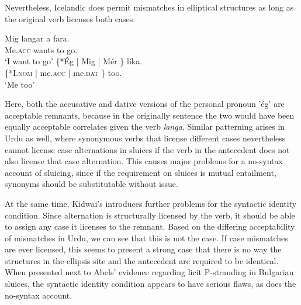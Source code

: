 \documentclass{turabian-researchpaper}
\begin{document}
Nevertheless, Icelandic does permit mismatches in elliptical structures as long as the original verb licenses both cases.

\begin{exe}
\ex\label{mariadrove}
\gll {} Mig langar {a\dh} fara. \\
{} Me.\textsc{acc} wants to go. \\
\trans `I want to go' 
\gll {} \{*\'Eg | Mig | M\'er \} l\'ika. \\ 
{} \{*I.\textsc{nom} | me.\textsc{acc} | me.\textsc{dat} \} too. \\
\trans `Me too' 
\end{exe}

Here, both the accusative and dative versions of the personal pronoun '\'eg' are acceptable remnants, because in the originally sentence the two would have been equally acceptable correlates given the verb \textit{langa}.  Similar patterning arises in Urdu as well, where synonymous verbs that license different cases nevertheless cannot license case alternations in sluices if the verb in the antecedent does not also license that case alternation. This causes major problems for a no-syntax account of sluicing, since if the requirement on sluices is mutual entailment, synonyms should be substitutable without issue. 

At the same time, Kidwai's introduces further problems for the syntactic identity condition. Since alternation is structurally licensed by the verb, it should be able to assign any case it licenses to the remnant. Based on the differing acceptability of mismatches in Urdu, we can see that this is not the case. If case mismatches are ever licensed, this seems to present a strong case that there is no way the structures in the ellipsis site and the antecedent are required to be identical. When presented next to Abels' evidence regarding licit P-stranding in Bulgarian sluices, the syntactic identity condition appears to have serious flaws, as does the no-syntax account. 



\end{document}
